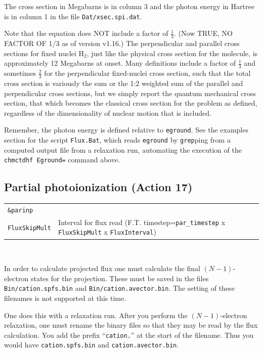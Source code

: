\documentclass[10pt,leqno, oneside]{book}
\begin{document}
The cross section in Megabarns is in column 3 and the photon energy in Hartree is in column 1 in the file \verb#Dat/xsec.spi.dat#.

Note that the equation does NOT  include a factor of $\frac{1}{3}$.
(Now TRUE, NO FACTOR OF 1/3 as of version v1.16.)
The perpendicular and parallel cross sections for fixed nuclei H$_2$,
just like the physical cross section for the molecule, is approximately 12 Megabarns at onset.  Many definitions include a factor of $\frac{1}{3}$
and sometimes $\frac{2}{3}$ for the perpendicular fixed-nuclei cross section, such that the total cross section is variously the sum or the
1:2 weighted sum of the parallel and perpendicular cross sections, but we simply report the
quantum mechanical cross section, that which becomes the classical cross section for the problem as defined, 
regardless of the dimensionality of nuclear motion that is included.

Remember, the photon energy is defined relative to \verb#eground#.  See the examples section for the script \verb#Flux.Bat#, which reads
\verb#eground# by \verb#grep#ping from a computed output file from a relaxation run, automating the execution of the 
\verb#chmctdhf Eground=# command above.


\subsection{Partial photoionization (Action 17)}

{\footnotesize
\begin{tabular}{ll}
\verb#&parinp# \\
\verb#FluxSkipMult#  & Interval for flux read (F.T. timestep=\verb#par_timestep# x \verb#FluxSkipMult# x \verb#FluxInterval#) \\
\end{tabular}}

\

In order to calculate projected flux one must calculate the final $(N-1)$-electron states for the projection.  These must be saved in
the files \verb#Bin/cation.spfs.bin# and \verb#Bin/cation.avector.bin#.  The setting of these filenames is not supported at this time.

One does this with a relaxation run.
After you perform the $(N-1)$-electron
relaxation, one must rename the binary files so that they may be read by the flux calculation.  You add the prefix ``\verb#cation.#'' at the start
of the filename.  Thus you would have \verb#cation.spfs.bin# and \verb#cation.avector.bin#.   
\end{document}
